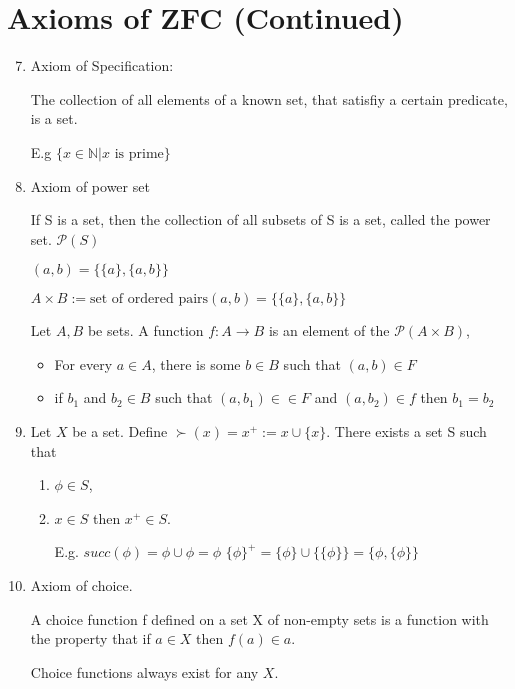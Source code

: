 \documentclass[twoside]{article}
\newcommand{\N}{\mathbb{N}}
\begin{document}

\section{Axioms of ZFC (Continued)}

\begin{enumerate}
    \setcounter{enumi}{6}
    \item Axiom of Specification:

    The collection of all elements of a known set, that satisfiy a certain predicate, is a set.

    E.g $\{x \in \N \vert x \text{ is prime}\}$
    
    \item Axiom of power set

    If S is a set, then the collection of all subsets of S is a set, called the power set. $\mathcal P (S)$

    $(a,b) = \{\{a\}, \{a, b\}\}$

    $A \times B := \text{set of ordered pairs} (a,b) = \{\{a\}, \{a, b\}\}$

    Let $A,B$ be sets. A function $f : A \rightarrow B$ is an element of the $\mathcal{P} (A \times B)$,

    \begin{itemize}
        \item For every $a \in A$, there is some $b \in B$ such that $(a,b) \in F$
        
       \item if $b_1$ and $b_2 \in B$ such that $(a,b_1) \in \in F$ and $(a, b_2) \in f$ then $b_1 = b_2$
    \end{itemize}

    \item Let $X$ be a set. Define $\succ(x) = x^{+} := x \cup \{x\}$.
    There exists a set S such that
    \begin{enumerate}
        \item $\phi \in S$, 
        \item $x \in S$ then $x^{+} \in S$.
        
        E.g. $succ(\phi) = \phi \cup {\phi} = {\phi}$
        $\{\phi\}^{+} = \{\phi\} \cup \{\{\phi\}\} = \{\phi, \{\phi\}\}$
    \end{enumerate}

    \item Axiom of choice. 

    A choice function f defined on a set X of non-empty sets is a function with the property that if $a \in X$ then $f(a) \in a$.

    Choice functions always exist for any $X$.
\end{enumerate}
\end{document}
